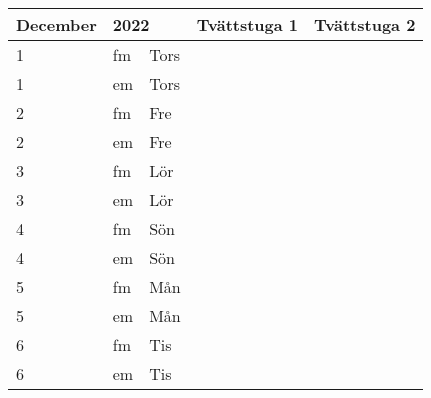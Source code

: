 \documentclass[a4paper]{article}
\begin{document}
\begin{table}[ht!]
\vspace{-10em}%
\normalsize
\begin{tabular}{lllp{7cm}p{7cm}}
\textbf{December}           & \multicolumn{2}{l}{\textbf{2022}}                  & \textbf{Tvättstuga 1} & \textbf{Tvättstuga 2} \\ \hline    

\multicolumn{1}{|l|}{1} & \multicolumn{1}{l|}{fm} & \multicolumn{1}{l|}{Tors} & \multicolumn{1}{l|}{} & \multicolumn{1}{l|}{} \\ \hline
\multicolumn{1}{|l|}{1} & \multicolumn{1}{l|}{em} & \multicolumn{1}{l|}{Tors} & \multicolumn{1}{l|}{} & \multicolumn{1}{l|}{} \\ \hline    

\multicolumn{1}{|l|}{2} & \multicolumn{1}{l|}{fm} & \multicolumn{1}{l|}{Fre} & \multicolumn{1}{l|}{} & \multicolumn{1}{l|}{} \\ \hline
\multicolumn{1}{|l|}{2} & \multicolumn{1}{l|}{em} & \multicolumn{1}{l|}{Fre} & \multicolumn{1}{l|}{} & \multicolumn{1}{l|}{} \\ \hline    

\multicolumn{1}{|l|}{3} & \multicolumn{1}{l|}{fm} & \multicolumn{1}{l|}{Lör} & \multicolumn{1}{l|}{} & \multicolumn{1}{l|}{} \\ \hline
\multicolumn{1}{|l|}{3} & \multicolumn{1}{l|}{em} & \multicolumn{1}{l|}{Lör} & \multicolumn{1}{l|}{} & \multicolumn{1}{l|}{} \\ \hline    

\multicolumn{1}{|l|}{4} & \multicolumn{1}{l|}{fm} & \multicolumn{1}{l|}{Sön} & \multicolumn{1}{l|}{} & \multicolumn{1}{l|}{} \\ \hline
\multicolumn{1}{|l|}{4} & \multicolumn{1}{l|}{em} & \multicolumn{1}{l|}{Sön} & \multicolumn{1}{l|}{} & \multicolumn{1}{l|}{} \\ \hline    

\multicolumn{1}{|l|}{5} & \multicolumn{1}{l|}{fm} & \multicolumn{1}{l|}{Mån} & \multicolumn{1}{l|}{} & \multicolumn{1}{l|}{} \\ \hline
\multicolumn{1}{|l|}{5} & \multicolumn{1}{l|}{em} & \multicolumn{1}{l|}{Mån} & \multicolumn{1}{l|}{} & \multicolumn{1}{l|}{} \\ \hline    

\multicolumn{1}{|l|}{6} & \multicolumn{1}{l|}{fm} & \multicolumn{1}{l|}{Tis} & \multicolumn{1}{l|}{} & \multicolumn{1}{l|}{} \\ \hline
\multicolumn{1}{|l|}{6} & \multicolumn{1}{l|}{em} & \multicolumn{1}{l|}{Tis} & \multicolumn{1}{l|}{} & \multicolumn{1}{l|}{} \\ \hline    


\end{tabular}
\end{table}
\end{document}
